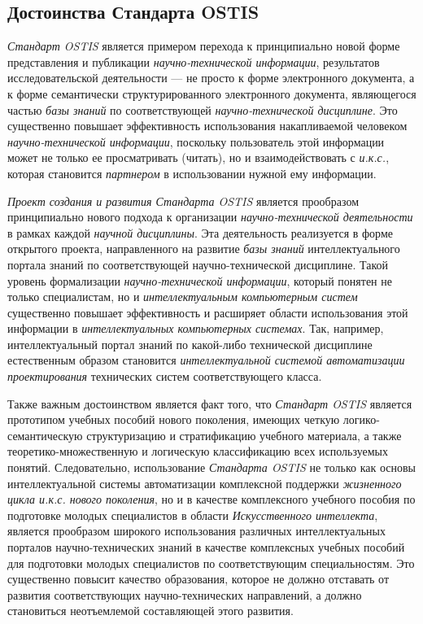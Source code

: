 \subsection{Достоинства Стандарта OSTIS}
\label{standard_advantages}

\textit{Стандарт OSTIS} является примером перехода к принципиально новой форме  представления и публикации \textit{научно-технической информации}, результатов исследовательской деятельности --- не просто к форме электронного документа, а к форме семантически структурированного электронного документа, являющегося частью \textit{базы знаний} по соответствующей \textit{научно-технической дисциплине}. Это существенно повышает эффективность использования накапливаемой человеком \textit{научно-технической информации}, поскольку пользователь этой информации может не только ее просматривать (читать), но и взаимодействовать с \textit{и.к.с.}, которая становится \textit{партнером} в использовании нужной ему информации.


\textit{Проект создания и развития Стандарта OSTIS} является прообразом принципиально нового подхода к организации \textit{научно-технической деятельности} в рамках каждой \textit{научной дисциплины}. Эта деятельность реализуется в форме открытого проекта, направленного на развитие \textit{базы знаний} интеллектуального портала знаний по соответствующей научно-технической дисциплине. Такой уровень формализации \textit{научно-технической информации}, который понятен не только специалистам, но и \textit{интеллектуальным компьютерным систем} существенно повышает эффективность и расширяет области использования этой информации в \textit{интеллектуальных компьютерных системах}. Так, например, интеллектуальный портал знаний по какой-либо технической дисциплине естественным образом становится \textit{интеллектуальной системой автоматизации проектирования} технических систем соответствующего класса.

Также важным достоинством является факт того, что \textit{Стандарт OSTIS} является прототипом учебных пособий нового поколения, имеющих четкую логико-семантическую структуризацию и стратификацию учебного материала, а также теоретико-множественную и логическую классификацию всех используемых понятий. Следовательно, использование \textit{Стандарта OSTIS} не только как основы интеллектуальной системы автоматизации комплексной поддержки \textit{жизненного цикла и.к.с. нового поколения}, но и в качестве комплексного учебного пособия по подготовке молодых специалистов в области \textit{Искусственного интеллекта}, является прообразом широкого использования различных интеллектуальных порталов научно-технических знаний в качестве комплексных учебных пособий для подготовки молодых специалистов по соответствующим специальностям. Это существенно повысит качество образования, которое не должно отставать от развития соответствующих научно-технических направлений, а должно становиться неотъемлемой составляющей этого развития.

